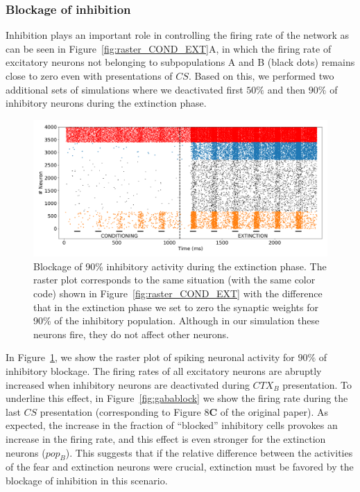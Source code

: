 \subsubsection{Blockage of inhibition}

Inhibition plays an important role in controlling the firing rate of the network as can be seen in Figure~\ref{fig:raster_COND_EXT}A, in which the firing rate of excitatory neurons not belonging to subpopulations A and B (black dots) remains close to zero even with presentations of $CS$. Based on this, we performed two additional sets of simulations where we deactivated first $50\%$ and then $90\%$ of inhibitory neurons during the extinction phase.

\begin{figure}[!ht]
\centering
\includegraphics[width=1.0\textwidth]{figures/raster_blockage_90.0.png}
\caption{\label{fig:90block} Blockage of 90\% inhibitory activity during the extinction phase. The raster plot corresponds to the same situation (with the same color code) shown in Figure~\ref{fig:raster_COND_EXT} with the difference that in the extinction phase we set to zero the synaptic weights for 90\% of the inhibitory population. Although in our simulation these neurons fire, they do not affect other neurons.}
\end{figure}
\FloatBarrier

In Figure~\ref{fig:90block}, we show the raster plot of spiking neuronal activity for $90\%$ of inhibitory blockage. The firing rates of all excitatory neurons are abruptly increased when inhibitory neurons are deactivated during $CTX_B$ presentation. To underline this effect, in Figure~\ref{fig:gabablock} we show the firing rate during the last $CS$ presentation (corresponding to Figure 8\textbf{C} of the original paper). As expected, the increase in the fraction of ``blocked'' inhibitory cells provokes an increase in the firing rate, and this effect is even stronger for the extinction neurons ($pop_B$). This suggests that if the relative difference between the activities of the fear and extinction neurons were crucial, extinction must be favored by the blockage of inhibition in this scenario.

